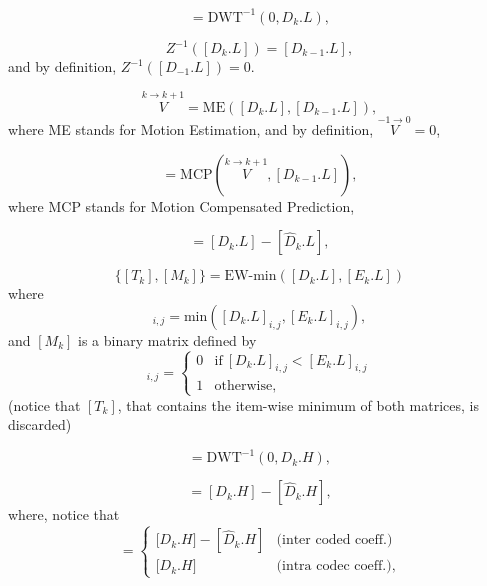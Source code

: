 \begin{equation}
  [D_k.L] = \text{DWT}^{-1}(0, D_k.L),
  \tag{b}
\end{equation}

\begin{equation}
  Z^{-1}([D_k.L]) = [D_{k-1}.L],
  \tag{c}
\end{equation}
and by definition, $Z^{-1}([D_{-1}.L]) = 0$.

\begin{equation}
  \overset{k\rightarrow k+1}{V} = \text{ME}([D_k.L], [D_{k-1}.L]),
  \tag{d}
\end{equation}
where ME stands for Motion Estimation, and by definition,
$\overset{-1\rightarrow 0}{V}=0$,

\begin{equation}
  [\hat{D}_k.L] = \text{MCP}(\overset{k\rightarrow k+1}{V}, [D_{k-1}.L]),
  \tag{e}
\end{equation}
where MCP stands for Motion Compensated Prediction,

\begin{equation}
  [E_k.L] = [D_k.L] - [\hat{D}_k.L],
  \tag{f}
\end{equation}

\begin{equation}
  \{[T_k],[M_k]\} = \text{EW-min}([D_k.L], [E_k.L])
  \tag{g}
\end{equation}
where
\begin{equation}
  [T_k]_{i,j}=\text{min}([D_k.L]_{i,j}, [E_k.L]_{i,j}),
\end{equation}
and $[M_k]$ is a binary matrix defined by
\begin{equation}
  [M_k]_{i,j} = \left\{
  \begin{array}{ll}
    0 & \text{if}~[D_k.L]_{i,j} < [E_k.L]_{i,j} \\
    1 & \text{otherwise},
  \end{array}
  \right.
  \label{eq:matrix}
\end{equation}
(notice that $[T_k]$, that contains the item-wise minimum of both matrices, is discarded)

\begin{equation}
  [D_k.H] = \text{DWT}^{-1}(0, D_k.H),
  \tag{h}
\end{equation}

\begin{equation}
  [E_k.H] = [D_k.H] - [\hat{D}_k.H],
  \tag{i}
\end{equation}
where, notice that
\begin{equation}
  [E_k.H] = \left\{
  \begin{array}{ll}
    {[}D_k.H{]} - [\hat{D}_k.H] & \text{(inter coded coeff.)} \\
    {[}D_k.H{]}                 & \text{(intra codec coeff.)},
  \end{array}
  \right.
\end{equation}

